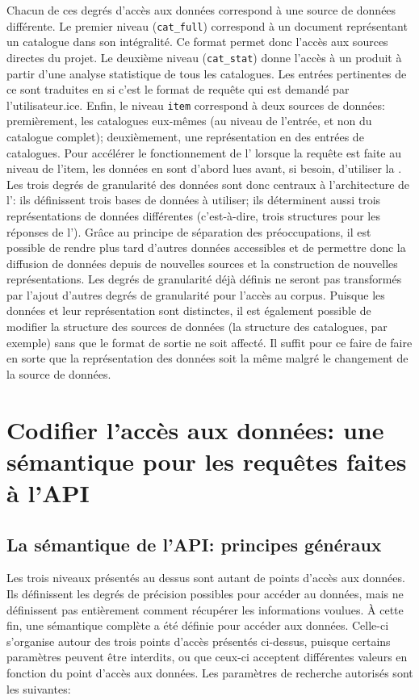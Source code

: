 Chacun de ces degrés d'accès aux données correspond à une source de données différente. Le premier niveau (\texttt{cat\_full}) correspond à un document \tei{} représentant un catalogue dans son intégralité. Ce format permet donc l'accès aux sources directes du projet. Le deuxième niveau (\texttt{cat\_stat}) donne l'accès à un \json{} produit à partir d'une analyse statistique de tous les catalogues. Les entrées pertinentes de ce \json{} sont traduites en \xmltei{} si c'est le format de requête qui est demandé par l'utilisateur.ice. Enfin, le niveau \texttt{item} correspond à deux sources de données: premièrement, les catalogues eux-mêmes (au niveau de l'entrée, et non du catalogue complet); deuxièmement, une représentation en \json{} des entrées de catalogues. Pour accélérer le fonctionnement de l'\api{} lorsque la requête est faite au niveau de l'item, les données en \json{} sont d'abord lues avant, si besoin, d'utiliser la \tei{}. Les trois degrés de granularité des données sont donc centraux à l'architecture de l'\api{}: ils définissent trois bases de données à utiliser; ils déterminent aussi trois représentations de données différentes (c'est-à-dire, trois structures pour les réponses de l'\api{}). Grâce au principe de séparation des préoccupations, il est possible de rendre plus tard d'autres données accessibles et de permettre donc la diffusion de données depuis de nouvelles sources et la construction de nouvelles représentations. Les degrés de granularité déjà définis ne seront pas transformés par l'ajout d'autres degrés de granularité pour l'accès au corpus. Puisque les données et leur représentation sont distinctes, il est également possible de modifier la structure des sources de données (la structure des catalogues, par exemple) sans que le format de sortie ne soit affecté. Il suffit pour ce faire de faire en sorte que la représentation des données soit la même malgré le changement de la source de données.

\section{Codifier l'accès aux données: une sémantique pour les requêtes faites à l'API}
\subsection{La sémantique de l'API: principes généraux}
Les trois niveaux présentés au dessus sont autant de points d'accès aux données. Ils définissent les degrés de précision possibles pour accéder au données, mais ne définissent pas entièrement comment récupérer les informations voulues. À cette fin, une sémantique complète a été définie pour accéder aux données. Celle-ci s'organise autour des trois points d'accès présentés ci-dessus, puisque certains paramètres peuvent être interdits, ou que ceux-ci acceptent différentes valeurs en fonction du point d'accès aux données. Les paramètres de recherche autorisés sont les suivantes:


